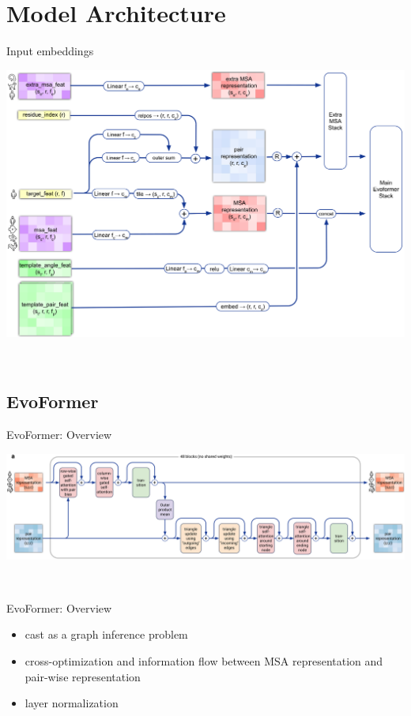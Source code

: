 \documentclass[presentation, smaller]{beamer}
\begin{document}
\section*{Model Architecture}
\label{sec:org1e1081a}
\begin{frame}[label={sec:orgba2eb21}]{Input embeddings}
\begin{center}
\includegraphics[width=.9\linewidth]{./imgs/input_embeddings.png}
\end{center}~\cite{jumperHighlyAccurateProtein2021}
\end{frame}

\subsection*{EvoFormer}
\label{sec:org2851ed6}

\begin{frame}[label={sec:org2a03b98}]{EvoFormer: Overview}
\begin{center}
\includegraphics[width=.9\linewidth]{./imgs/model-evoformer-main.png}
\end{center}~\cite{jumperHighlyAccurateProtein2021}
\end{frame}
\begin{frame}[label={sec:org1c20265}]{EvoFormer: Overview}
\begin{itemize}
\item cast as a graph inference problem
\item cross-optimization and information flow between MSA representation and pair-wise representation
\item layer normalization
\end{itemize}~\cite{jumperHighlyAccurateProtein2021}
\end{frame}
\end{document}
